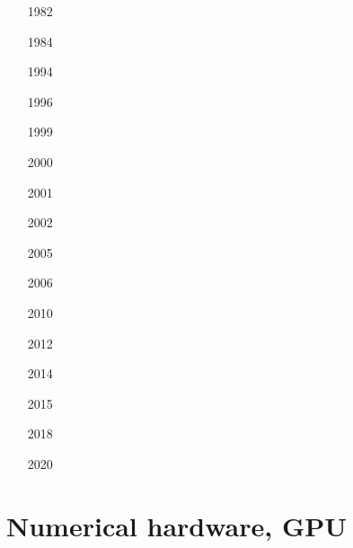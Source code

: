\begin{scriptsize}
\begin{itemize}
\item[1982]
\item[1984]
\item[1994]
\item[1996]
\item[1999]
\item[2000]
\item[2001]
\item[2002]
\item[2005]
\item[2006]
\item[2010]
\item[2012]
\item[2014]
\item[2015]
\item[2018]
\item[2020]
\end{itemize}
\end{scriptsize}















\section{Numerical hardware, GPU}
\label{sec:topics:hardware}

